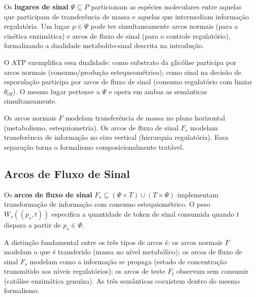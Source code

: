 Os \textbf{lugares de sinal} $\Psi \subseteq P$ particionam as espécies
moleculares entre aquelas que participam de transferência de massa e aquelas que
intermediam informação regulatória. Um lugar $p \in \Psi$ pode ter
simultaneamente arcos normais (para a cinética enzimática) e arcos de fluxo de
sinal (para o controle regulatório), formalizando a dualidade metabolito-sinal
descrita na introdução.

O ATP exemplifica essa dualidade: como substrato da glicólise participa por
arcos normais (consumo/produção estequeométrico); como sinal na decisão de
esporulação participa por arcos de fluxo de sinal (consumo regulatório com
limiar $\theta_{\mathrm{eff}}$). O mesmo lugar pertence a $\Psi$ e opera em ambas as semânticas
simultaneamente.

\begin{principle}
\label{princ:separacao}
Os arcos normais $F$ modelam transferência de massa no plano horizontal
(metabolismo, estequiometria). Os arcos de fluxo de sinal $F_s$ modelam
transferência de informação no eixo vertical (hierarquia regulatória). Essa
separação torna o formalismo composicionalmente tratável.
\end{principle}

\subsection{Arcos de Fluxo de Sinal}
\label{subsec:arcos-sinal}

Os \textbf{arcos de fluxo de sinal} $F_s \subseteq (\Psi \times T) \cup
(T \times \Psi)$ implementam transformação de informação com consumo
estequiométrico. O peso $W_s((p_s, t))$ especifica a quantidade de token de
sinal consumida quando $t$ dispara a partir de $p_s \in \Psi$.

A distinção fundamental entre os três tipos de arcos é: os arcos normais $F$
modelam o que é transferido (massa no nível metabólico); os arcos de fluxo de
sinal $F_s$ modelam como a informação se propaga (estado de concentração
transmitido aos níveis regulatórios); os arcos de teste $F_t$ observam sem
consumir (catálise enzimática genuína). As três semânticas coexistem dentro do
mesmo formalismo.

